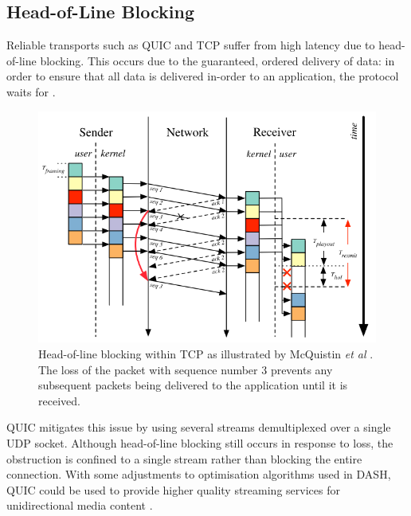 \documentclass{mpaper}
\begin{document}
\subsection{Head-of-Line Blocking}

Reliable transports such as QUIC and TCP suffer from high latency due to head-of-line blocking. This occurs due to the guaranteed, ordered delivery of data: in order to ensure that all data is delivered in-order to an application, the protocol waits for .

\begin{figure}[h]
\includegraphics[scale=0.4]{images/holtcp}
\centering
\caption{Head-of-line blocking within TCP as illustrated by McQuistin \textit{et al} \cite{McQuistin2016}. The loss of the packet with sequence number 3 prevents any subsequent packets being delivered to the application until it is received.}
\end{figure}

QUIC mitigates this issue by using several streams demultiplexed 
over a single UDP socket. Although head-of-line blocking still occurs in response to loss, the 
obstruction is confined to a single stream rather than blocking the entire connection. With some 
adjustments to optimisation algorithms used in DASH, QUIC could be used to provide higher quality 
streaming services for unidirectional media content \cite{Bhat2017}.


\end{document}
